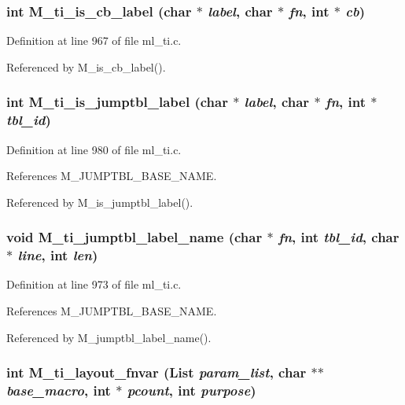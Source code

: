 \subsubsection{\setlength{\rightskip}{0pt plus 5cm}int M\_\-ti\_\-is\_\-cb\_\-label (char $\ast$ {\em label}, char $\ast$ {\em fn}, int $\ast$ {\em cb})}\label{ml__ti_8c_a750c25c0c4205d01c954b6a49cb325a}




Definition at line 967 of file ml\_\-ti.c.

Referenced by M\_\-is\_\-cb\_\-label().
\subsubsection{\setlength{\rightskip}{0pt plus 5cm}int M\_\-ti\_\-is\_\-jumptbl\_\-label (char $\ast$ {\em label}, char $\ast$ {\em fn}, int $\ast$ {\em tbl\_\-id})}\label{ml__ti_8c_f4ed8b1e5ececfdb0268ccdb9d071a5d}




Definition at line 980 of file ml\_\-ti.c.

References M\_\-JUMPTBL\_\-BASE\_\-NAME.

Referenced by M\_\-is\_\-jumptbl\_\-label().
\subsubsection{\setlength{\rightskip}{0pt plus 5cm}void M\_\-ti\_\-jumptbl\_\-label\_\-name (char $\ast$ {\em fn}, int {\em tbl\_\-id}, char $\ast$ {\em line}, int {\em len})}\label{ml__ti_8c_8f4c814faa0dc82fde65e781a8b64ea7}




Definition at line 973 of file ml\_\-ti.c.

References M\_\-JUMPTBL\_\-BASE\_\-NAME.

Referenced by M\_\-jumptbl\_\-label\_\-name().
\subsubsection{\setlength{\rightskip}{0pt plus 5cm}int M\_\-ti\_\-layout\_\-fnvar (\bf{List} {\em param\_\-list}, char $\ast$$\ast$ {\em base\_\-macro}, int $\ast$ {\em pcount}, int {\em purpose})}\label{ml__ti_8c_cb96589fb7b8f72ef4f020421e32c6c1}





